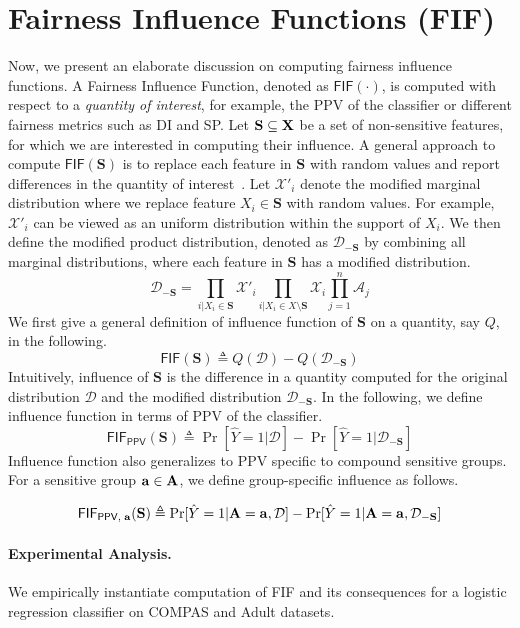 \section{Fairness Influence Functions (FIF)}
Now, we present an elaborate discussion on computing fairness influence functions.
A Fairness Influence Function, denoted as $ \mathsf{FIF}(\cdot) $, is computed with respect to a \textit{quantity of interest}, for example, the  PPV of the classifier or different fairness metrics such as DI and SP. Let $ \mathbf{S}  \subseteq \mathbf{X} $ be a set of non-sensitive features, for which we are interested in computing their influence. A general approach to compute $ \mathsf{FIF}(\mathbf{S}) $ is to replace each feature in $ \mathbf{S} $ with random values and report differences in the quantity of interest~\cite{datta2016algorithmic}. Let $ \mathcal{X}'_i $ denote the modified marginal distribution where we replace feature $ X_i \in \mathbf{S} $ with random values. For example, $ \mathcal{X}'_i $ can be viewed as an uniform distribution within the support of $ X_i $. We then define the modified product distribution, denoted as $ \mathcal{D}_{-\mathbf{S}} $ by combining all marginal distributions, where each feature in $ \mathbf{S} $ has a modified distribution. 
\[
\mathcal{D}_{-\mathbf{S}} = \prod_{i | X_i \in \mathbf{S}} \mathcal{X}'_i \prod_{i | X_i \in X \setminus \mathbf{S}} \mathcal{X}_i \prod_{j=1}^{n} \mathcal{A}_j 
\]
We first give a general definition of influence function of $ \mathbf{S} $ on a quantity, say $ Q $, in the following. 
\[
\mathsf{FIF}(\mathbf{S}) \triangleq Q(\mathcal{D}) - Q(\mathcal{D}_{-\mathbf{S}})
\]
Intuitively, influence of $ \mathbf{S} $ is the difference in a quantity computed for the original distribution $ \mathcal{D} $ and the modified distribution $ \mathcal{D}_{-\mathbf{S}} $. In the following, we define influence function in terms of PPV of the classifier. 
\[
\mathsf{FIF}_{\mathsf{PPV}}(\mathbf{S}) \triangleq \Pr[\hat{Y} = 1 | \mathcal{D}] - \Pr[\hat{Y} = 1 | \mathcal{D}_{-\mathbf{S}}]
\]
Influence function also generalizes to PPV specific to compound sensitive groups. For a sensitive group $ \mathbf{a} \in \mathbf{A} $, we define group-specific influence as follows. 

\[
\mathsf{FIF}_{\mathsf{PPV},\; \mathbf{a}}(\mathbf{S}) \triangleq \Pr[\hat{Y} = 1 | \mathbf{A} = \mathbf{a}, \mathcal{D}] - \Pr[\hat{Y} = 1 | \mathbf{A} = \mathbf{a},  \mathcal{D}_{-\mathbf{S}}]
\]

\paragraph{Experimental Analysis.} We empirically instantiate computation of FIF and its consequences for a logistic regression classifier on COMPAS and Adult datasets.

